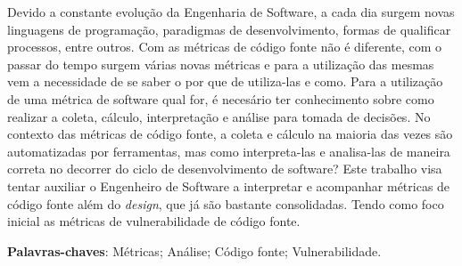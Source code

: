\begin{resumo}

Devido a constante evolução da Engenharia de Software, a cada dia surgem 
novas linguagens de programação, paradigmas de desenvolvimento, formas de
qualificar processos, entre outros. Com as métricas de código fonte não 
é diferente, com o passar do tempo surgem várias novas métricas e para
a utilização das mesmas vem a necessidade de se saber o por que de 
utiliza-las e como. Para a utilização de uma métrica de software qual for,
é necesário ter conhecimento sobre como realizar a coleta, cálculo, 
interpretação e análise para tomada de decisões. No contexto das métricas de
código fonte, a coleta e cálculo na maioria das vezes são automatizadas por
ferramentas, mas como interpreta-las e analisa-las de maneira correta no
decorrer do ciclo de desenvolvimento de software? Este trabalho visa tentar
auxiliar o Engenheiro de Software a interpretar e acompanhar métricas de 
código fonte além do \textit{design}, que já são bastante consolidadas. Tendo
como foco inicial as métricas de vulnerabilidade de código fonte.

 \vspace{\onelineskip}
    
 \noindent
 \textbf{Palavras-chaves}: Métricas; Análise; Código fonte; Vulnerabilidade.
\end{resumo}
